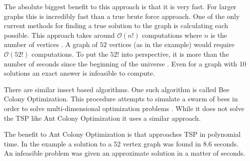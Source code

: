 \documentclass[twocolumn]{article}
\begin{document}
The absolute biggest benefit to this approach is that it is very fast. For larger graphs
this is incredibly fast than a true brute force approach. One of the only current methods
for finding a true solution to the graph is calculating each possible. This approach takes
around $\mathcal{O}(n!)$ computations where $n$ is the number of vertices \cite{yu_2014}. 
A graph of $52$ vertices (as in the example) would require $\mathcal{O}(52!)$ computations. 
To put the $52!$ into perspective, it is more than the number of seconds since the 
beginning of the universe \cite{nasa_2006}. Even for a graph with 10 
solutions an exact answer is infeasible to compute.

There are similar insect based algorithms. One such algorithm is called 
Bee Colony Optimization. This procedure attempts to simulate a swarm of bees in order to solve 
multi-dimensional optimization problems \cite{Karaboga2005ANIB}. While it does not solve the 
TSP like Ant Colony Optimization it uses a similar approach.

The benefit to Ant Colony Optimization is that approaches TSP in polynomial time. In the example
a solution to a 52 vertex graph was found in 8.6 seconds. 
An infeasible problem was given an approximate solution in a matter of seconds.
\printbibliography

\end{document}
